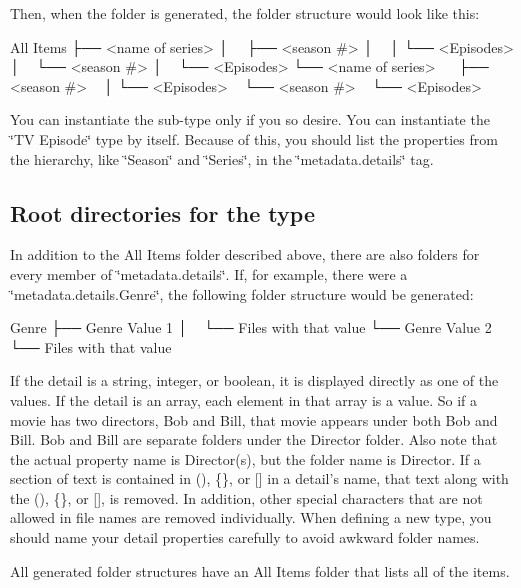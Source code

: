 Then, when the folder is generated, the folder structure would look like this\-: \begin{DoxyVerb}All Items
├── <name of series>
│   ├── <season #>
│   │   └── <Episodes>
│   └── <season #>
│       └── <Episodes>
└── <name of series>
    ├── <season #>
    │   └── <Episodes>
    └── <season #>
        └── <Episodes>
\end{DoxyVerb}


You can instantiate the sub-\/type only if you so desire. You can instantiate the {\ttfamily \char`\"{}\-T\-V Episode\char`\"{}} type by itself. Because of this, you should list the properties from the hierarchy, like {\ttfamily \char`\"{}\-Season\char`\"{}} and {\ttfamily \char`\"{}\-Series\char`\"{}}, in the {\ttfamily \char`\"{}metadata.\-details\char`\"{}} tag.

\subsection*{Root directories for the type}

In addition to the {\ttfamily All Items} folder described above, there are also folders for every member of {\ttfamily \char`\"{}metadata.\-details\char`\"{}}. If, for example, there were a {\ttfamily \char`\"{}metadata.\-details.\-Genre\char`\"{}}, the following folder structure would be generated\-: \begin{DoxyVerb}Genre
├── Genre Value 1
│   └── Files with that value
└── Genre Value 2
    └── Files with that value
\end{DoxyVerb}


If the detail is a string, integer, or boolean, it is displayed directly as one of the values. If the detail is an array, each element in that array is a value. So if a movie has two directors, {\ttfamily Bob} and {\ttfamily Bill}, that movie appears under both {\ttfamily Bob} and {\ttfamily Bill}. {\ttfamily Bob} and {\ttfamily Bill} are separate folders under the {\ttfamily Director} folder. Also note that the actual property name is {\ttfamily Director(s)}, but the folder name is {\ttfamily Director}. If a section of text is contained in {\ttfamily ()}, {\ttfamily \{\}}, or {\ttfamily \mbox{[}\mbox{]}} in a detail's name, that text along with the {\ttfamily ()}, {\ttfamily \{\}}, or {\ttfamily \mbox{[}\mbox{]}}, is removed. In addition, other special characters that are not allowed in file names are removed individually. When defining a new type, you should name your detail properties carefully to avoid awkward folder names.

All generated folder structures have an {\ttfamily All Items} folder that lists all of the items. 